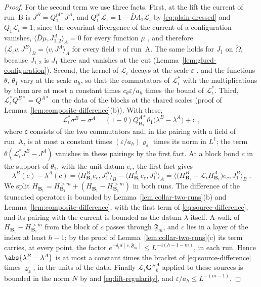 \begin{proof}
For the second term we use three facts. First, at the lift the current of run~B is $J^B = Q^{\mathrm{pl}*}_1J^A$, and $Q^{\mathrm{pl}}_1\mathcal L_\iota = 1 - \bar D\Lambda_1\mathcal L_\iota$ by \eqref{eq:plain-dressed} and $Q_1\mathcal L_\iota = 1$; since the covariant divergence of the current of a configuration vanishes, $\langle\bar D\mu, J^A_{1,2}\rangle_A = 0$ for every function $\mu$ \cite[(3.117)]{BalabanPBG}, and therefore $\langle\mathcal L_\iota v, J^B\rangle_B = \langle v, J^A\rangle_A$ for every field $v$ of run~A. The same holds for $J_1$ on $\tilde\Omega$, because $J_{1,2}$ is $J_1$ there and vanishes at the cut (Lemma~\ref{lem:glued-configuration}). Second, the kernel of $\mathcal L_\iota$ decays at the scale $\varepsilon$ \cite[(3.133)]{BalabanPBG}, and the functions $\theta$, $\theta_1$ vary at the scale $a_h$, so that the commutators of $\mathcal L_\iota^*$ with the multiplications by them are at most a constant times $c_\theta\varepsilon/a_h$ times the bound of $\mathcal L_\iota^*$. Third, $\mathcal L_\iota^*Q^{B*} = Q^{A*}$ on the data of the blocks at the shared scales (proof of Lemma~\ref{lem:composite-difference}(b)). With these,
\[
    \mathcal L_\iota^*\sigma^B - \sigma^A = (1 - \theta)Q^{A*}_{\mathbf B_1}\theta_1\bigl(\lambda^B - \lambda^A\bigr) + \mathsf c\;,
\]
where $\mathsf c$ consists of the two commutators and, in the pairing with a field of run~A, is at most a constant times $(\varepsilon/a_h)\varrho_{\mathfrak s}$ times its norm in $L^1$; the term $\theta(\mathcal L_\iota^*J^B - J^A)$ vanishes in these pairings by the first fact. At a block bond $c$ in the support of $\theta_1$, with the unit datum $e_c$, the first fact gives
\[
    \lambda^B(c) - \lambda^A(c) = \bigl\langle H^B_{\mathbf B_1}e_c, J^B_1\bigr\rangle_B - \bigl\langle H^A_{\mathbf B_1}e_c, J^A_1\bigr\rangle_A = \bigl\langle\bigl(H^B_{\mathbf B_1} - \mathcal L_\iota H^A_{\mathbf B_1}\bigr)e_c, J^B_1\bigr\rangle_B\;.
\]
We split $H_{\mathbf B_1} = H^{>m}_{\mathbf B_1} + (H_{\mathbf B_1} - H^{>m}_{\mathbf B_1})$ in both runs. The difference of the truncated operators is bounded by Lemma~\ref{lem:collar-two-runs}(b) and Lemma~\ref{lem:composite-difference}, with the first term of \eqref{eq:source-difference}, and its pairing with the current is bounded as the datum $\lambda$ itself. A walk of $H_{\mathbf B_1} - H^{>m}_{\mathbf B_1}$ from the block of $c$ passes through $\mathfrak F_m$, and $c$ lies in a layer of the index at least $h - 1$; by the proof of Lemma~\ref{lem:collar-two-runs}(c) its term carries, at every point, the factor $e^{-\delta_td(c,\mathfrak F_m)} \leq L^{-4(h-1-m)}$, in each run. Hence $\abs{\lambda^B - \lambda^A}$ is at most a constant times the bracket of \eqref{eq:source-difference} times $\varrho_{\mathfrak s}$, in the units of the data. Finally $\mathcal L_\iota\mathbf G''^A_k$ applied to these sources is bounded in the norm $N$ by \cite[(3.42)]{BalabanPBG} and \eqref{eq:lift-regularity}, and $\varepsilon/a_h \leq L^{-(m-1)}$.
\end{proof}

